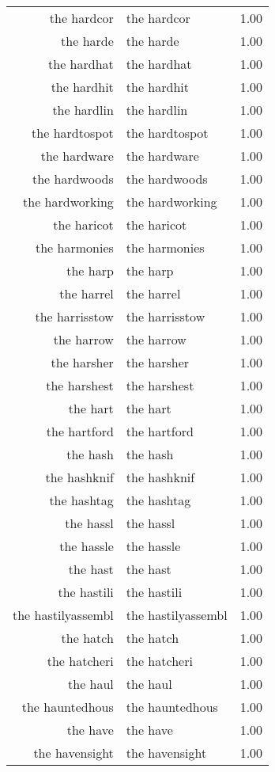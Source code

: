 \begin{table}[ht]
\begin{tabular}{rlr}
  the hardcor & the hardcor & 1.00 \\ 
  the harde & the harde & 1.00 \\ 
  the hardhat & the hardhat & 1.00 \\ 
  the hardhit & the hardhit & 1.00 \\ 
  the hardlin & the hardlin & 1.00 \\ 
  the hardtospot & the hardtospot & 1.00 \\ 
  the hardware & the hardware & 1.00 \\ 
  the hardwoods & the hardwoods & 1.00 \\ 
  the hardworking & the hardworking & 1.00 \\ 
  the haricot & the haricot & 1.00 \\ 
  the harmonies & the harmonies & 1.00 \\ 
  the harp & the harp & 1.00 \\ 
  the harrel & the harrel & 1.00 \\ 
  the harrisstow & the harrisstow & 1.00 \\ 
  the harrow & the harrow & 1.00 \\ 
  the harsher & the harsher & 1.00 \\ 
  the harshest & the harshest & 1.00 \\ 
  the hart & the hart & 1.00 \\ 
  the hartford & the hartford & 1.00 \\ 
  the hash & the hash & 1.00 \\ 
  the hashknif & the hashknif & 1.00 \\ 
  the hashtag & the hashtag & 1.00 \\ 
  the hassl & the hassl & 1.00 \\ 
  the hassle & the hassle & 1.00 \\ 
  the hast & the hast & 1.00 \\ 
  the hastili & the hastili & 1.00 \\ 
  the hastilyassembl & the hastilyassembl & 1.00 \\ 
  the hatch & the hatch & 1.00 \\ 
  the hatcheri & the hatcheri & 1.00 \\ 
  the haul & the haul & 1.00 \\ 
  the hauntedhous & the hauntedhous & 1.00 \\ 
  the have & the have & 1.00 \\ 
  the havensight & the havensight & 1.00 \\ 

\end{tabular}
\end{table}
